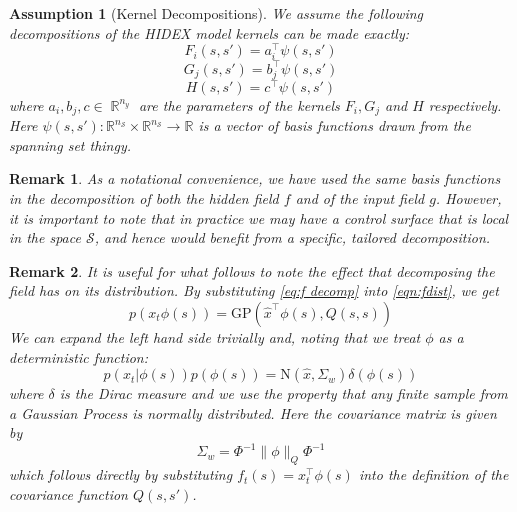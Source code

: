 \documentclass{IEEEtran}
\newcommand{\dist}[2]{\|#1\|_{#2}}
\DeclareMathOperator{\R}{\mathbb{R}}
\DeclareMathOperator{\onto}{\rightarrow}
\newtheorem{remark}{Remark}
\newtheorem{assumption}{Assumption}
\begin{document}
\begin{assumption}[Kernel Decompositions]
	\label{ass:kerndecomp}
	We assume the following decompositions of the HIDEX model kernels can be made exactly:
	\begin{equation}
	F_i(s,s') = a_i^\top\psi(s,s')
\end{equation}
\begin{equation}
	G_j(s,s') = b_j^\top\psi(s,s')
\end{equation}
\begin{equation}
	H(s,s') = c^\top\psi(s,s')
\end{equation}
where $a_i, b_j, c \in \R^{n_y}$ are the parameters of the kernels $F_i, G_j$ and $H$ respectively. Here $\psi(s,s') : \mathbb{R}^{n_\mathcal{S}} \times \mathbb{R}^{n_\mathcal{S}} \onto \mathbb{R}$ is a vector of basis functions drawn from the spanning set thingy.
\end{assumption}

\begin{remark}
As a notational convenience, we have used the same basis functions in the decomposition of both the hidden field $f$ and of the input field $g$. However, it is important to note that in practice we may have a control surface that is local in the space $\mathcal{S}$, and hence would benefit from a specific, tailored decomposition. 
\end{remark}

\begin{remark}
	It is useful for what follows to note the effect that decomposing the field has on its distribution. By substituting \ref{eq:f decomp} into \ref{eqn:fdist}, we get
	\begin{equation}
		p(x_t\phi(s)) = \mathrm{GP}(\hat{x}^\top\phi(s),Q(s,s))
	\end{equation}
	We can expand the left hand side trivially and, noting that we treat $\phi$ as a deterministic function:
	 \begin{equation}
		p(x_t|\phi(s))p(\phi(s)) = \mathrm{N}(\hat{x},\Sigma_w)\delta(\phi(s))
	\end{equation}
	where $\delta$ is the Dirac measure and we use the property that any finite sample from a Gaussian Process is normally distributed. Here the covariance matrix is given by
	\begin{equation}
		\Sigma_w = \Phi^{-1}\dist{\phi}{Q} \Phi^{-1}
	\end{equation}
	which follows directly by substituting $f_t(s) = x_t^\top\phi(s)$ into the definition of the covariance function $Q(s,s')$.
\end{remark}
\end{document}
